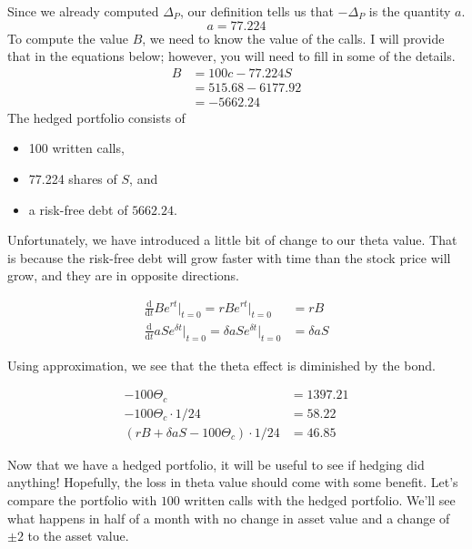 \documentclass{ximera}
\begin{document}
\begin{solution}
Since we already computed $\Delta_P$, our definition tells us that $-\Delta_P$ is the quantity $a$.
	\begin{equation*}
	a=77.224
	\end{equation*}
To compute the value $B$, we need to know the value of the calls. I will provide that in the equations below; however, you will need to fill in some of the details.
	\begin{align*}
	B 	&=100c-77.224S\\
		&=515.68-6177.92\\
		&=-5662.24
	\end{align*}
The hedged portfolio consists of
	\begin{itemize}
	\item 100 written calls,\\
	\item 77.224 shares of $S$, and\\
	\item a risk-free debt of $5662.24$.
	\end{itemize}
\end{solution}

Unfortunately, we have introduced a little bit of change to our theta value. That is because the risk-free debt will grow faster with time than the stock price will grow, and they are in opposite directions.

\begin{align*}
\frac{\mathrm{d}}{\mathrm{d}t}Be^{rt}\vert_{t=0}=rBe^{rt}\vert_{t=0}	 			&=rB\\
\frac{\mathrm{d}}{\mathrm{d}t}aSe^{\delta t}\vert_{t=0}=\delta aSe^{\delta t}\vert_{t=0} 	&=\delta aS
\end{align*}

Using approximation, we see that the theta effect is diminished by the bond.

\begin{align*}
-100\Theta_c 						&=1397.21\\
-100\Theta_c\cdot 1/24 					&=58.22\\ 
(rB+\delta aS-100\Theta_c)\cdot 1/24 			&=46.85
\end{align*}

Now that we have a hedged portfolio, it will be useful to see if hedging did anything! Hopefully, the loss in theta value should come with some benefit. Let's compare the portfolio with $100$ written calls with the hedged portfolio. We'll see what happens in half of a month with no change in asset value and a change of $\pm 2$ to the asset value.
\end{document}

